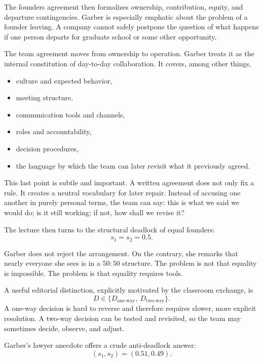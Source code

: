 The founders agreement then formalizes ownership, contribution, equity, and departure contingencies. Garber is especially emphatic about the problem of a founder leaving. A company cannot safely postpone the question of what happens if one person departs for graduate school or some other opportunity.

The team agreement moves from ownership to operation. Garber treats it as the internal constitution of day-to-day collaboration. It covers, among other things,

\begin{itemize}
\item culture and expected behavior,
\item meeting structure,
\item communication tools and channels,
\item roles and accountability,
\item decision procedures,
\item the language by which the team can later revisit what it previously agreed.
\end{itemize}

This last point is subtle and important. A written agreement does not only fix a rule. It creates a neutral vocabulary for later repair. Instead of accusing one another in purely personal terms, the team can say: this is what we said we would do; is it still working; if not, how shall we revise it?

The lecture then turns to the structural deadlock of equal founders:
\begin{equation}
s_1 = s_2 = 0.5.
\end{equation}

Garber does not reject the arrangement. On the contrary, she remarks that nearly everyone she sees is in a \(50\!:\!50\) structure. The problem is not that equality is impossible. The problem is that equality requires tools.

A useful editorial distinction, explicitly motivated by the classroom exchange, is
\begin{equation}
D \in \{D_{\text{one-way}},\ D_{\text{two-way}}\}.
\end{equation}
A one-way decision is hard to reverse and therefore requires slower, more explicit resolution. A two-way decision can be tested and revisited, so the team may sometimes decide, observe, and adjust.

Garber's lawyer anecdote offers a crude anti-deadlock answer:
\begin{equation}
(s_1,s_2) = (0.51, 0.49).
\end{equation}

